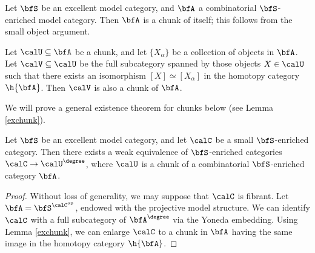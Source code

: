 \begin{example}
Let $\bfS$ be an excellent model category, and $\bfA$ a combinatorial $\bfS$-enriched model category.
Then $\bfA$ is a chunk of itself; this follows from the small object argument.
\end{example}

\begin{example}
Let $\calU \subseteq \bfA$ be a chunk, and let $\{ X_{\alpha} \}$ be a collection of objects in $\bfA$.
Let $\calV \subseteq \calU$ be the full subcategory spanned by those objects $X \in \calU$
such that there exists an isomorphism $[X] \simeq [X_{\alpha}]$ in the homotopy category
$\h{\bfA}$. Then $\calV$ is also a chunk of $\bfA$.
\end{example}

We will prove a general existence theorem for chunks below (see Lemma \ref{exchunk}).

\begin{lemma}\label{tubble}
Let $\bfS$ be an excellent model category, and let $\calC$ be a small $\bfS$-enriched
category. Then there exists a weak equivalence of $\bfS$-enriched categories
$\calC \rightarrow \calU^{\degree}$, where $\calU$ is a chunk of a combinatorial
$\bfS$-enriched category $\bfA$.
\end{lemma}

\begin{proof}
Without loss of generality, we may suppose that $\calC$ is fibrant. Let
$\bfA = \bfS^{ \calC^{op}}$, endowed with the projective model structure.
We can identify $\calC$ with a full subcategory of $\bfA^{\degree}$ via the Yoneda embedding.
Using Lemma \ref{exchunk}, we can enlarge $\calC$ to a chunk in $\bfA$ having the same
image in the homotopy category $\h{\bfA}$.
\end{proof}

